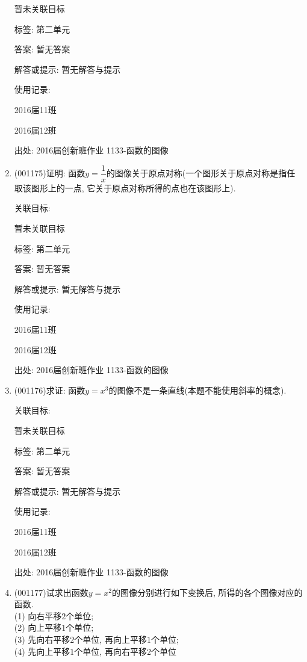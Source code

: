 \documentclass[10pt,a4paper]{article}
\begin{document}
\begin{enumerate}[1.]
暂未关联目标



标签: 第二单元

答案: 暂无答案

解答或提示: 暂无解答与提示

使用记录:

2016届11班	

2016届12班	


出处: 2016届创新班作业	1133-函数的图像
\item { (001175)}证明: 函数$y=\dfrac{1}{x}$的图像关于原点对称(一个图形关于原点对称是指任取该图形上的一点, 它关于原点对称所得的点也在该图形上).


关联目标:

暂未关联目标



标签: 第二单元

答案: 暂无答案

解答或提示: 暂无解答与提示

使用记录:

2016届11班	

2016届12班	


出处: 2016届创新班作业	1133-函数的图像
\item { (001176)}求证: 函数$y=x^3$的图像不是一条直线(本题不能使用斜率的概念).


关联目标:

暂未关联目标



标签: 第二单元

答案: 暂无答案

解答或提示: 暂无解答与提示

使用记录:

2016届11班	

2016届12班	


出处: 2016届创新班作业	1133-函数的图像
\item { (001177)}试求出函数$y=x^2$的图像分别进行如下变换后, 所得的各个图像对应的函数.\\ 
(1) 向右平移$2$个单位;\\ 
(2) 向上平移$1$个单位;\\ 
(3) 先向右平移$2$个单位, 再向上平移$1$个单位;\\ 
(4) 先向上平移$1$个单位, 再向右平移$2$个单位



\end{enumerate}
\end{document}

